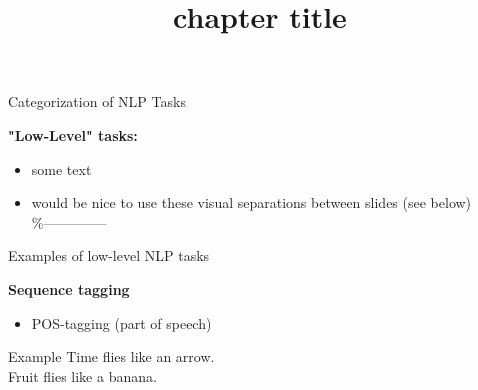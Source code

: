 


\newcommand*\POS[1]{\textsubscript{\texttt{#1}}} %
\usepackage{qtree} %

\newcommand{\titlefigure}{figure/tasks.png}
\newcommand{\learninggoals}{
\item defined the key learning goals here
\item second learning goal}

\title{chapter title}
\date{}




\begin{vbframe}{Categorization of NLP Tasks}

\vfill

\textbf{"Low-Level" tasks:}

	\begin{itemize}
		\item some text
		\item would be nice to use these visual separations between slides (see below)\\
					\%--------------
	\end{itemize}

\vfill

\end{vbframe}


\begin{vbframe}{Examples of low-level NLP tasks}

\textbf{Sequence tagging}

\begin{itemize}
	\item POS-tagging (part of speech)
\end{itemize}
	
\begin{exampleblock}{Example}
	Time flies   like   an   arrow.\\Fruit   flies   like   a   banana.
\end{exampleblock}

\vfill

\end{vbframe}

